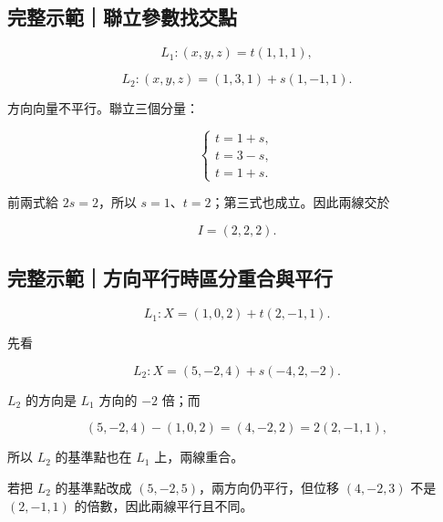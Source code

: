 \documentclass[11pt,a4paper]{article}
\begin{document}
\begin{HandoutWorkedExample}

\subsection{完整示範｜聯立參數找交點}\label{ux5b8cux6574ux793aux7bc4ux806fux7acbux53c3ux6578ux627eux4ea4ux9ede}

\[
L_1:(x,y,z)=t(1,1,1),
\]

\[
L_2:(x,y,z)=(1,3,1)+s(1,-1,1).
\]

方向向量不平行。聯立三個分量：

\[
\begin{cases}
t=1+s,\\
t=3-s,\\
t=1+s.
\end{cases}
\]

前兩式給 \(2s=2\)，所以 \(s=1\)、\(t=2\)；第三式也成立。因此兩線交於

\[
\boxed{I=(2,2,2)}.
\]

\end{HandoutWorkedExample}

\begin{HandoutWorkedExample}

\subsection{完整示範｜方向平行時區分重合與平行}\label{ux5b8cux6574ux793aux7bc4ux65b9ux5411ux5e73ux884cux6642ux5340ux5206ux91cdux5408ux8207ux5e73ux884c}

\[
L_1:X=(1,0,2)+t(2,-1,1).
\]

先看

\[
L_2:X=(5,-2,4)+s(-4,2,-2).
\]

\(L_2\) 的方向是 \(L_1\) 方向的 \(-2\) 倍；而

\[
(5,-2,4)-(1,0,2)=(4,-2,2)=2(2,-1,1),
\]

所以 \(L_2\) 的基準點也在 \(L_1\) 上，兩線重合。

若把 \(L_2\) 的基準點改成 \((5,-2,5)\)，兩方向仍平行，但位移 \((4,-2,3)\) 不是 \((2,-1,1)\) 的倍數，因此兩線平行且不同。

\end{HandoutWorkedExample}
\end{document}
